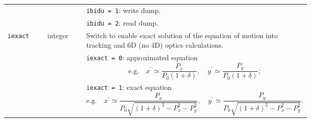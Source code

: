 \begin{longtabu}{@{}llp{0.7\linewidth}}
                           &          & \texttt{ibidu = 1}: write dump. \\
                           &          & \texttt{ibidu = 2}: read dump. \\
    \texttt{iexact}        & integer  & Switch to enable exact solution of the equation of motion into tracking and 6D (no 4D) optics calculations. \\
                           &          & \texttt{iexact = 0}: approximated equation
                           \begin{equation*}
                                \mbox{e.g.}
                                \quad x^\prime \simeq \frac{P_x}{P_0(1+\delta)},
                                \quad y^\prime \simeq \frac{P_y}{P_0(1+\delta)};
                           \end{equation*} \\
                           &          & \texttt{iexact = 1}: exact equation
                           \begin{equation*}
                                \mbox{e.g.}
                                \quad x^\prime \simeq \frac{P_x}{P_0\sqrt{(1+\delta)^2-P_x^2-P_y^2}},
                                \quad y^\prime \simeq \frac{P_y}{P_0\sqrt{(1+\delta)^2-P_x^2-P_y^2}}.
                           \end{equation*}
\end{longtabu}

